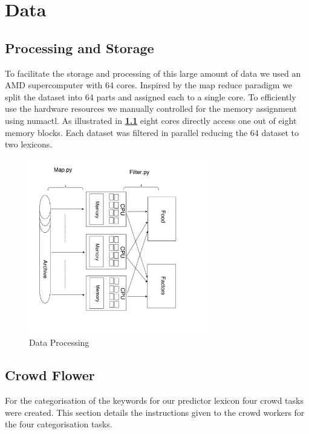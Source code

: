\chapter{Data}

\section{Processing and Storage}

To facilitate the storage and processing of this large amount of data we used an AMD supercomputer with 64 cores. Inspired by the  map reduce paradigm we split the dataset into 64 parts and assigned each to a single core. To efficiently use the hardware resources we manually controlled for the memory assignment using numactl. As illustrated in\textbf{ \ref{fig:dataProcessing}} eight cores directly access one out of eight memory blocks. Each dataset was filtered in parallel reducing the 64 dataset to two lexicons. 

 \begin{figure}[H]
\centerline{ \noindent\includegraphics[width=0.7\textwidth]{img/abs/hw_model}}
 \caption{Data Processing}
 \label{fig:dataProcessing}
\end{figure}

\section{Crowd Flower}

For the categorisation of the keywords for our predictor lexicon four crowd tasks were created. This section details the instructions given to the crowd workers for the four categorisation tasks. 

